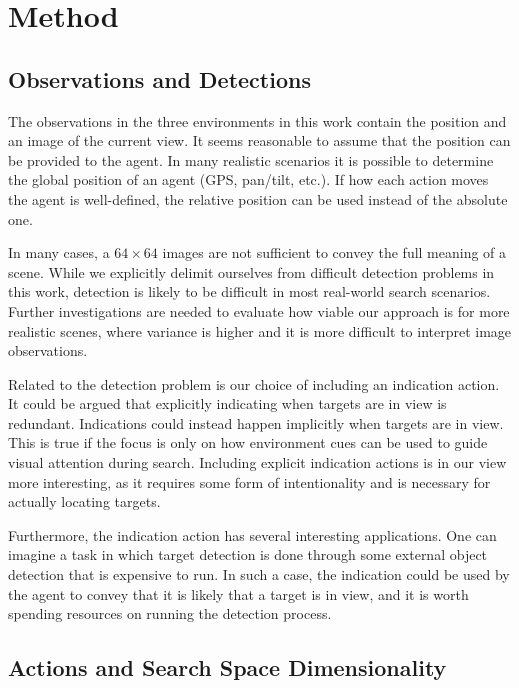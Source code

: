 \section{Method}
\label{sec:discussion-method}

\subsection{Observations and Detections}

The observations in the three environments in this work contain the position and an image of the current view.
It seems reasonable to assume that the position can be provided to the agent.
In many realistic scenarios it is possible to determine the global position of an agent (GPS, pan/tilt, etc.).
If how each action moves the agent is well-defined, the relative position can be used instead of the absolute one.

In many cases, a \(64 \times 64\) images are not sufficient to convey the full meaning of a scene.
While we explicitly delimit ourselves from difficult detection problems in this work,
detection is likely to be difficult in most real-world search scenarios.
Further investigations are needed to evaluate how viable our approach is for more realistic scenes,
where variance is higher and it is more difficult to interpret image observations.

Related to the detection problem is our choice of including an indication action.
It could be argued that explicitly indicating when targets are in view is redundant.
Indications could instead happen implicitly when targets are in view.
This is true if the focus is only on how environment cues can be used to guide visual attention during search.
Including explicit indication actions is in our view more interesting, as it requires some form of intentionality and is necessary for actually locating targets.

Furthermore, the indication action has several interesting applications.
One can imagine a task in which target detection is done through some external object detection that is expensive to run.
In such a case, the indication could be used by the agent to convey that it is likely that a target is in view, and it is worth spending resources on running the detection process.

\subsection{Actions and Search Space Dimensionality}


